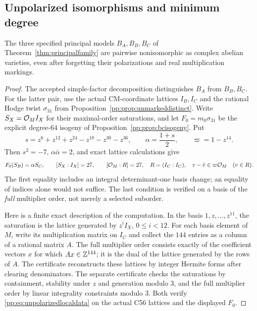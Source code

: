 \subsection{Unpolarized isomorphisms and minimum degree}
\begin{proposition}
\label{pp:prop:unpolarizeddistinct}
The three specified principal models $B_A,B_B,B_C$ of
Theorem~\ref{thm:principalfamily} are pairwise nonisomorphic as complex
abelian varieties, even after forgetting their polarizations and real
multiplication markings.
\end{proposition}
\begin{proof}
The accepted simple-factor decomposition distinguishes $B_A$ from
$B_B,B_C$. For the latter pair, use the actual CM-coordinate lattices
$I_B,I_C$ and the rational Hodge twist $\sigma_{31}$ from
Proposition~\ref{pp:prop:unmarkeddistinct}. Write
$S_X=\mathcal O_M I_X$ for their maximal-order saturations, and let
$F_0=m_0\sigma_{31}$ be the explicit degree-$64$ isogeny of
Proposition~\ref{pp:prop:bcisogeny}. Put
\[
 s=z^6+z^{12}+z^{24}-z^{18}-z^{30}-z^{36},\qquad
 \alpha=\frac{1+s}{2},\qquad \varpi=1-z^{14}.
\]
Then $s^2=-7$, $\alpha\bar\alpha=2$, and exact lattice calculations give
\begin{equation}\label{pp:eq:unpolarizedlocaldata}
 F_0(S_B)=\alpha S_C,\qquad [S_X:I_X]=27,\qquad
 [\mathcal O_M:R]=27,\quad R=(I_C:I_C),\quad
 v-\bar v\in\varpi\mathcal O_M\quad(v\in R).
\end{equation}
The first equality includes an integral determinant-one basis change;
an equality of indices alone would not suffice. The last condition is
verified on a basis of the \emph{full} multiplier order, not merely a
selected suborder.

Here is a finite exact description of the computation. In the basis
$1,z,\ldots,z^{11}$, the saturation is the lattice generated by
$z^i I_X$, $0\leq i<12$. For each basis element of $M$, write its
multiplication matrix on $I_C$ and collect the $144$ entries as a column
of a rational matrix $A$. The full multiplier order consists exactly
of the coefficient vectors $x$ for which $Ax\in\mathbb Z^{144}$; it is the
dual of the lattice generated by the rows of $A$.
The certificate 
reconstructs these lattices by integer Hermite forms after clearing
denominators. The separate certificate
 checks the
saturations by containment, stability under $z$ and generation modulo
$3$, and the full multiplier order by linear integrality constraints
modulo $3$. Both verify \eqref{pp:eq:unpolarizedlocaldata} on the actual
C56 lattices and the displayed $F_0$.


\end{proof}

